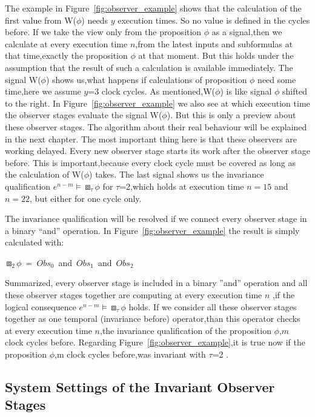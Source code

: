 The example in Figure~\ref{fig:observer_example} shows that the calculation of the first value from W($\phi$) needs $y$
execution times. So no value is defined in the cycles before. If we take the view only from the proposition $\phi$ as a signal,then we calculate
at every execution time $n$,from the latest inputs and subformulas at that time,exactly the proposition $\phi$ at that moment.
But this holds under the assumption that the result of such a calculation is available immediately.
The signal W($\phi$) shows us,what happens if calculations of proposition $\phi$ need some time,here we assume $y$=3 clock cycles.
As mentioned,W($\phi$) is like signal $\phi$ shifted to the right.
In Figure~\ref{fig:observer_example} we also see at which execution time the observer stages evaluate the signal W($\phi$).
But this is only a preview about these observer stages. The algorithm about their real behaviour will be explained in the next chapter.
The most important thing here is that these observers are working delayed. Every new observer stage starts its work after the observer stage before.
This is important,because every clock cycle must be covered as long as the calculation of W($\phi$) takes. 
The last signal shows us the invariance qualification $e^{n-m} \models \boxbox_\tau \phi$ for $\tau$=2,which holds at execution time $n=15$ and $n=22$,
but either for one cycle only.

The invariance qualification will be resolved if we connect every observer stage in a binary ``and'' operation.
In Figure~\ref{fig:observer_example} the result is simply calculated with:
\newline
\begin{center} 
\mbox{$\boxbox_2 \phi$ = $Obs_0$ and $Obs_1$ and $Obs_2$}
\end{center}
\newpage
Summarized, every observer stage is included in a binary ''and'' operation and all these observer stages together are computing at every execution time $n$
,if the logical consequence $e^{n-m} \models \boxbox_\tau \phi$ holds. 
If we consider all these observer stages together as one temporal (invariance before) operator,than this operator checks
at every execution time $n$,the invariance qualification of the proposition $\phi$,$m$ clock cycles before.
Regarding Figure~\ref{fig:observer_example},it is true now if the proposition $\phi$,m clock cycles before,was invariant with $\tau$=2 .
\newline

\subsection{System Settings of the Invariant Observer Stages}

